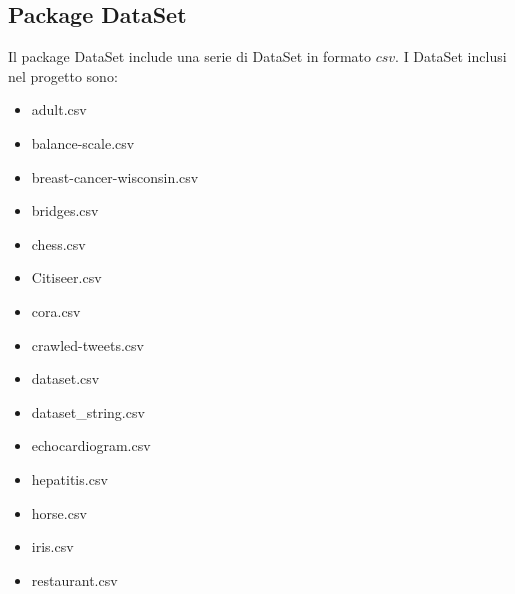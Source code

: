 \subsection{Package DataSet}
Il package DataSet include una serie di DataSet in formato $csv$. I DataSet inclusi nel progetto sono:
\begin{itemize}[noitemsep]
	\let\labelitemi\labelitemii
	\item adult.csv
	\item balance-scale.csv
	\item breast-cancer-wisconsin.csv
	\item bridges.csv
	\item chess.csv
	\item Citiseer.csv
	\item cora.csv
	\item crawled-tweets.csv
	\item dataset.csv
	\item dataset{\_}string.csv
	\item echocardiogram.csv
	\item hepatitis.csv
	\item horse.csv
	\item iris.csv
	\item restaurant.csv
\end{itemize}
